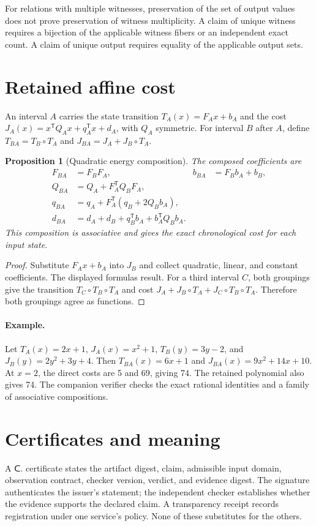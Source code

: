\documentclass[11pt,a4paper]{article}
\newtheorem{proposition}{Proposition}
\begin{document}
For relations with multiple witnesses, preservation of the set of output
values does not prove preservation of witness multiplicity. A claim of
unique witness requires a bijection of the applicable witness fibers or an
independent exact count. A claim of unique output requires equality of the
applicable output sets.

\section{Retained affine cost}
An interval $A$ carries the state transition
$T_A(x)=F_Ax+b_A$ and the cost
$J_A(x)=x^\mathsf{T}Q_Ax+q_A^\mathsf{T}x+d_A$, with $Q_A$ symmetric.
For interval $B$ after $A$, define
$T_{BA}=T_B\circ T_A$ and $J_{BA}=J_A+J_B\circ T_A$.
\begin{proposition}[Quadratic energy composition]
The composed coefficients are
\begin{align*}
F_{BA}&=F_BF_A,&b_{BA}&=F_Bb_A+b_B,\\
Q_{BA}&=Q_A+F_A^\mathsf{T}Q_BF_A,\\
q_{BA}&=q_A+F_A^\mathsf{T}(q_B+2Q_Bb_A),\\
d_{BA}&=d_A+d_B+q_B^\mathsf{T}b_A+b_A^\mathsf{T}Q_Bb_A.
\end{align*}
This composition is associative and gives the exact chronological cost
for each input state.
\end{proposition}
\begin{proof}
Substitute $F_Ax+b_A$ into $J_B$ and collect quadratic,
linear, and constant coefficients. The displayed formulas result.
For a third interval $C$, both groupings give the transition
$T_C\circ T_B\circ T_A$ and cost
$J_A+J_B\circ T_A+J_C\circ T_B\circ T_A$.
Therefore both groupings agree as functions.
\end{proof}

\paragraph{Example.}
Let $T_A(x)=2x+1$, $J_A(x)=x^2+1$,
$T_B(y)=3y-2$, and $J_B(y)=2y^2+3y+4$.
Then $T_{BA}(x)=6x+1$ and
$J_{BA}(x)=9x^2+14x+10$.
At $x=2$, the direct costs are 5 and 69, giving 74.
The retained polynomial also gives 74. The companion verifier checks
the exact rational identities and a family of associative compositions.

\section{Certificates and meaning}
A {\taafont ᑕ.} certificate states the artifact digest, claim,
admissible input domain, observation contract, checker version, verdict,
and evidence digest. The signature authenticates the issuer's statement;
the independent checker establishes whether the evidence supports the
declared claim. A transparency receipt records registration under one
service's policy. None of these substitutes for the others.
\end{document}
